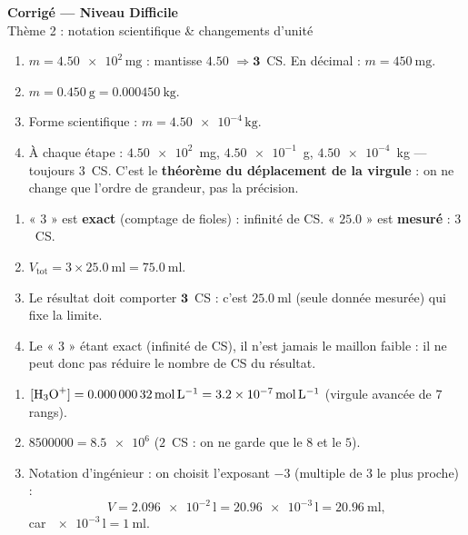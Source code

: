 \documentclass[11pt,a4paper]{article}
\begin{document}
\begin{center}
{\Large\bfseries\color{primarydark} Corrigé — Niveau Difficile}\\[1pt]
{\color{primary} Thème 2 : notation scientifique \& changements d'unité}
\end{center}
\vspace{2mm}

\begin{cor}
\begin{enumerate}[label=\alph*),leftmargin=1.6em,itemsep=1pt]
  \item $m=\num{4,50e2}\,\si{\milli\gram}$ : mantisse $\num{4,50}$ $\Rightarrow \mathbf{3}$~CS. En décimal :
        $m=\qty{450}{\milli\gram}$.
  \item $m=\qty{0,450}{\gram}=\qty{0,000450}{\kilo\gram}$.
  \item Forme scientifique : $\boxed{m=\num{4,50e-4}\,\si{\kilo\gram}}$.
  \item À chaque étape : $\num{4,50e2}$~mg, $\num{4,50e-1}$~g, $\num{4,50e-4}$~kg — toujours
        $3$~CS. C'est le \textbf{théorème du déplacement de la virgule} : on ne change que l'ordre de
        grandeur, pas la précision.
\end{enumerate}
\end{cor}

\begin{cor}
\begin{enumerate}[label=\alph*),leftmargin=1.6em,itemsep=1pt]
  \item « $3$ » est \textbf{exact} (comptage de fioles) : infinité de CS. « $\num{25,0}$ » est
        \textbf{mesuré} : $3$~CS.
  \item $V_{\text{tot}} = 3\times\qty{25,0}{\milli\litre}=\qty{75,0}{\milli\litre}$.
  \item Le résultat doit comporter $\mathbf{3}$~CS : c'est $\qty{25,0}{\milli\litre}$ (seule donnée
        mesurée) qui fixe la limite.
  \item Le « $3$ » étant exact (infinité de CS), il n'est jamais le maillon faible : il ne peut donc
        pas réduire le nombre de CS du résultat.
\end{enumerate}
\end{cor}

\begin{cor}
\begin{enumerate}[label=\alph*),leftmargin=1.6em,itemsep=1pt]
  \item $[\ce{H3O+}]=\num{0,00000032}\,\si{\mol\per\litre}=\num{3,2e-7}\,\si{\mol\per\litre}$ (virgule
        avancée de $7$ rangs).
  \item $\num{8500000}=\num{8,5e6}$ ($2$~CS : on ne garde que le $8$ et le $5$).
  \item Notation d'ingénieur : on choisit l'exposant $-3$ (multiple de $3$ le plus proche) :
        \[ V=\num{2,096e-2}\,\si{\litre}=\num{20,96e-3}\,\si{\litre}=\qty{20,96}{\milli\litre}, \]
        car $\num{e-3}\,\si{\litre}=\qty{1}{\milli\litre}$.
\end{enumerate}
\end{cor}
\end{document}
